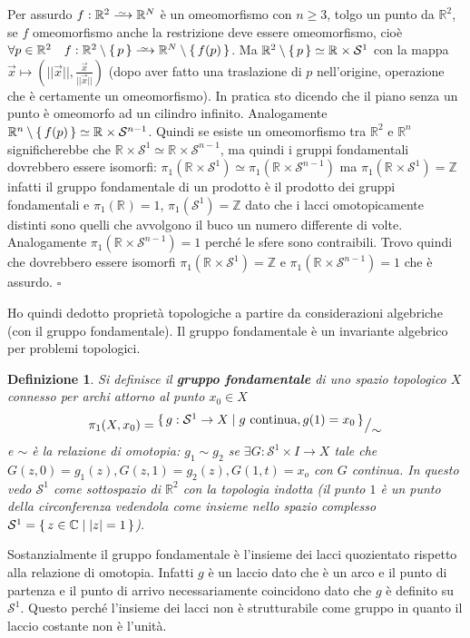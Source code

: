 \documentclass[10pt, twoside=false, x11names]{scrbook}
\newtheorem{definition}[theorem]{Definizione}
\newenvironment{proof}{{\textbf{Dimostrazione}:}}{\hfill $\square$}
\newcommand{\Z}{\mathbb{Z}}
\newcommand{\RN}[1][]{\mathbb{R}^#1}
\newcommand{\Sph}[1][]{\mathcal{S}^#1}
\newcommand{\homoto}{\xrightarrow{\,\smash{\raisebox{-0.65ex}{\ensuremath{\scriptstyle\sim}}}\,}}
\newcommand*\quot[2]{{^{\textstyle #1}\big/_{\textstyle #2}}}
\begin{document}
\newmathsymb{homoto}{\homoto}{Omeomorfismo}
\begin{proof}
  Per assurdo $ f : \RN{2} \homoto \RN{N} $ è un omeomorfismo con
  $ n \geq 3 $, tolgo un punto da $ \RN{2} $, se $ f $ omeomorfismo anche la restrizione deve essere omeomorfismo, cioè
  $ \forall p \in \RN{2} \quad f:\RN{2} \setminus \set{p} \homoto \RN{N} \setminus \set{f(p)} $.
  Ma $ \RN{2} \setminus \set{p} \simeq \RN{} \times \mathcal{S}^1 $ con la mappa
  $ \vec{x} \mapsto \left( || \vec{x} ||, \frac{\vec{x}}{|| \vec{x} ||} \right) $ (dopo aver fatto
  una traslazione di $ p $ nell'origine, operazione che è certamente un omeomorfismo). In pratica
  sto dicendo che il piano senza un punto è omeomorfo ad un cilindro infinito.
  Analogamente $ \RN{n} \setminus \set{f(p)} \simeq \RN{} \times \Sph{n-1} $. Quindi se esiste un omeomorfismo tra $ \RN{2} $ e
  $ \RN{n} $ significherebbe che $ \RN{} \times \Sph{1} \simeq \RN{} \times \Sph{n-1} $, ma quindi i gruppi fondamentali
  dovrebbero essere isomorfi:
  $ \pi_1 (\RN{} \times \Sph{1}) \simeq \pi_1(\RN{}\times \Sph{n-1}) $ ma
  $ \pi_1 (\RN{} \times \Sph{1}) = \Z $ infatti il gruppo fondamentale di un prodotto è il prodotto dei gruppi
  fondamentali e $ \pi_1(\RN{}) = 1 $, $ \pi_1(\Sph{1}) = \Z $ dato che i lacci omotopicamente distinti
  sono quelli che avvolgono il buco un numero differente di volte. Analogamente $ \pi_1(\RN{}\times \Sph{n-1}) = 1 $
  perché le sfere sono contraibili. Trovo quindi che dovrebbero essere isomorfi $ \pi_1 (\RN{} \times \Sph{1}) = \Z $
  e $ \pi_1(\RN{}\times \Sph{n-1}) = 1 $ che è assurdo.
\end{proof}

Ho quindi dedotto proprietà topologiche a partire da considerazioni algebriche (con il gruppo fondamentale).
Il gruppo fondamentale è un invariante algebrico per problemi topologici.

\begin{definition}
  Si definisce il \textbf{gruppo fondamentale} di uno spazio topologico $ X $
  connesso per archi attorno al punto $ x_0 \in X $
  \[
    \pi_1 (X, x_0) = \quot{\set{ g: \Sph{1} \to X | g \text{ continua}, g(1) = x_0}}{\sim}
  \]
  e $ \sim $ è la relazione di omotopia: $ g_1 \sim g_2 $ se $ \exists G: \mathcal{S}^1 \times I \to X  $ tale che
  $ G(z,0) = g_1(z), G(z,1) = g_2(z), G(1,t) = x_o $ con $ G $ continua. In questo vedo $ \Sph{1} $ come sottospazio
  di $ \RN{2} $ con la topologia indotta (il punto $ 1 $ è un punto della circonferenza vedendola come
  insieme nello spazio complesso $ \Sph{1} = \set{ z \in \mathbb{C} | |z| = 1} $).
\end{definition}
Sostanzialmente il gruppo fondamentale è l'insieme dei lacci quozientato rispetto alla relazione di omotopia.
Infatti $ g $ è un laccio dato che è un arco e il punto di partenza e il punto di arrivo necessariamente
coincidono dato che $ g $ è definito su $ \Sph{1} $.
Questo perché l'insieme dei lacci non è strutturabile come gruppo in quanto il laccio costante non è
l'unità.
\end{document}
